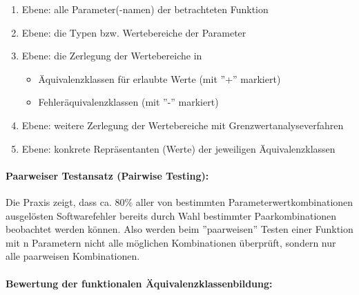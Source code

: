 \begin{enumerate}
	\item Ebene: alle Parameter(-namen) der betrachteten Funktion
	\item Ebene: die Typen bzw. Wertebereiche der Parameter
	\item Ebene: die Zerlegung der Wertebereiche in
	\begin{itemize}
		\item Äquivalenzklassen für erlaubte Werte (mit ''+'' markiert)
		\item Fehleräquivalenzklassen (mit ''-'' markiert)
	\end{itemize}
	\item Ebene:  weitere Zerlegung der Wertebereiche mit Grenzwertanalyseverfahren
	\item Ebene:  konkrete Repräsentanten (Werte) der jeweiligen Äquivalenzklassen
\end{enumerate}

\paragraph{Paarweiser Testansatz (Pairwise Testing):}

Die Praxis zeigt, dass ca. 80\% aller von bestimmten Parameterwertkombinationen ausgelösten Softwarefehler bereits durch Wahl bestimmter Paarkombinationen beobachtet werden können. Also werden beim ''paarweisen'' Testen einer Funktion mit n Parametern nicht alle möglichen Kombinationen überprüft, sondern nur alle paarweisen Kombinationen.

\paragraph{Bewertung der funktionalen Äquivalenzklassenbildung:}

